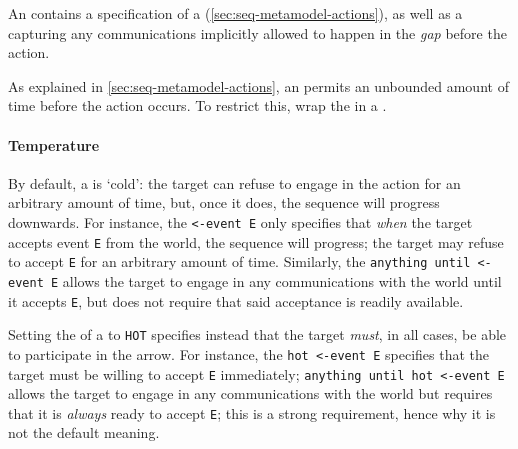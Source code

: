 An \mactionstep{} contains a specification of a
\msequenceaction{} (\cref{sec:seq-metamodel-actions}), as well as
a \mmessageset{}
capturing any communications implicitly allowed to happen
in the \emph{gap} before the action.

\begin{remark}
  As explained in \cref{sec:seq-metamodel-actions},
  an \mactionstep{} permits an unbounded amount of
  time before the action occurs.
  To restrict this, wrap the \mactionstep{} in a \mdeadlinestep.
\end{remark}


\paragraph{Temperature}


By default, a \mactionstep{} is `cold': the target can refuse to engage
in the action for an arbitrary amount of time, but, once it does, the
sequence will progress downwards.
For instance, the
\marrowaction{} \lstinline[language=RoboCert]{<-event E}
only specifies that \emph{when} the target accepts event \texttt{E} from
the world, the sequence will progress; the target may refuse to accept
\texttt{E} for an arbitrary amount of time.
Similarly, the \mactionstep{} \lstinline[language=RoboCert]{anything until <-event E}
allows the target to engage in any communications with the world
until it accepts \texttt{E}, but does not require that said
acceptance is readily available.

Setting the  of a \marrowaction{} to
\texttt{HOT} specifies instead
that the target \emph{must}, in all cases, be able to participate in the
arrow.
For instance, the
\mactionstep{} \lstinline[language=RoboCert]{hot <-event E}
specifies that the target must be willing to accept \texttt{E} immediately;
\lstinline[language=RoboCert]{anything until hot <-event E}
allows the target to engage in any communications with the world
but requires that it is \emph{always} ready to accept \texttt{E}; this is
a strong requirement, hence why it is not the default meaning.




